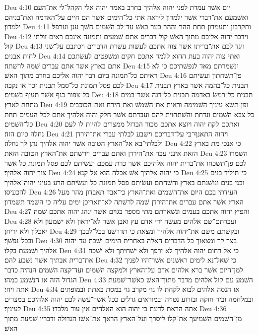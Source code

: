 Deu 4:10  יום אשׁר עמדת לפני יהוה אלהיך בחרב באמר יהוה אלי הקהל־לי את־העם ואשׁמעם את־דברי אשׁר ילמדון ליראה אתי כל־הימים אשׁר הם חיים על־האדמה ואת־בניהם ילמדון׃
Deu 4:11  ותקרבון ותעמדון תחת ההר וההר בער באשׁ עד־לב השׁמים חשׁך ענן וערפל׃
Deu 4:12  וידבר יהוה אליכם מתוך האשׁ קול דברים אתם שׁמעים ותמונה אינכם ראים זולתי קול׃
Deu 4:13  ויגד לכם את־בריתו אשׁר צוה אתכם לעשׂות עשׂרת הדברים ויכתבם על־שׁני לחות אבנים׃
Deu 4:14  ואתי צוה יהוה בעת ההוא ללמד אתכם חקים ומשׁפטים לעשׂתכם אתם בארץ אשׁר אתם עברים שׁמה לרשׁתה׃
Deu 4:15  ונשׁמרתם מאד לנפשׁתיכם כי לא ראיתם כל־תמונה ביום דבר יהוה אליכם בחרב מתוך האשׁ׃
Deu 4:16  פן־תשׁחתון ועשׂיתם לכם פסל תמונת כל־סמל תבנית זכר או נקבה׃
Deu 4:17  תבנית כל־בהמה אשׁר בארץ תבנית כל־צפור כנף אשׁר תעוף בשׁמים׃
Deu 4:18  תבנית כל־רמשׂ באדמה תבנית כל־דגה אשׁר־במים מתחת לארץ׃
Deu 4:19  ופן־תשׂא עיניך השׁמימה וראית את־השׁמשׁ ואת־הירח ואת־הכוכבים כל צבא השׁמים ונדחת והשׁתחוית להם ועבדתם אשׁר חלק יהוה אלהיך אתם לכל העמים תחת כל־השׁמים׃
Deu 4:20  ואתכם לקח יהוה ויוצא אתכם מכור הברזל ממצרים להיות לו לעם נחלה כיום הזה׃
Deu 4:21  ויהוה התאנף־בי על־דבריכם וישׁבע לבלתי עברי את־הירדן ולבלתי־בא אל־הארץ הטובה אשׁר יהוה אלהיך נתן לך נחלה׃
Deu 4:22  כי אנכי מת בארץ הזאת אינני עבר את־הירדן ואתם עברים וירשׁתם את־הארץ הטובה הזאת׃
Deu 4:23  השׁמרו לכם פן־תשׁכחו את־ברית יהוה אלהיכם אשׁר כרת עמכם ועשׂיתם לכם פסל תמונת כל אשׁר צוך יהוה אלהיך׃
Deu 4:24  כי יהוה אלהיך אשׁ אכלה הוא אל קנא׃
Deu 4:25  כי־תוליד בנים ובני בנים ונושׁנתם בארץ והשׁחתם ועשׂיתם פסל תמונת כל ועשׂיתם הרע בעיני יהוה־אלהיך להכעיסו׃
Deu 4:26  העידתי בכם היום את־השׁמים ואת־הארץ כי־אבד תאבדון מהר מעל הארץ אשׁר אתם עברים את־הירדן שׁמה לרשׁתה לא־תאריכן ימים עליה כי השׁמד תשׁמדון׃
Deu 4:27  והפיץ יהוה אתכם בעמים ונשׁארתם מתי מספר בגוים אשׁר ינהג יהוה אתכם שׁמה׃
Deu 4:28  ועבדתם־שׁם אלהים מעשׂה ידי אדם עץ ואבן אשׁר לא־יראון ולא ישׁמעון ולא יאכלון ולא יריחן׃
Deu 4:29  ובקשׁתם משׁם את־יהוה אלהיך ומצאת כי תדרשׁנו בכל־לבבך ובכל־נפשׁך׃
Deu 4:30  בצר לך ומצאוך כל הדברים האלה באחרית הימים ושׁבת עד־יהוה אלהיך ושׁמעת בקלו׃
Deu 4:31  כי אל רחום יהוה אלהיך לא ירפך ולא ישׁחיתך ולא ישׁכח את־ברית אבתיך אשׁר נשׁבע להם׃
Deu 4:32  כי שׁאל־נא לימים ראשׁנים אשׁר־היו לפניך למן־היום אשׁר ברא אלהים אדם על־הארץ ולמקצה השׁמים ועד־קצה השׁמים הנהיה כדבר הגדול הזה או הנשׁמע כמהו׃
Deu 4:33  השׁמע עם קול אלהים מדבר מתוך־האשׁ כאשׁר־שׁמעת אתה ויחי׃
Deu 4:34  או הנסה אלהים לבוא לקחת לו גוי מקרב גוי במסת באתת ובמופתים ובמלחמה וביד חזקה ובזרוע נטויה ובמוראים גדלים ככל אשׁר־עשׂה לכם יהוה אלהיכם במצרים לעיניך׃
Deu 4:35  אתה הראת לדעת כי יהוה הוא האלהים אין עוד מלבדו׃
Deu 4:36  מן־השׁמים השׁמיעך את־קלו ליסרך ועל־הארץ הראך את־אשׁו הגדולה ודבריו שׁמעת מתוך האשׁ׃

